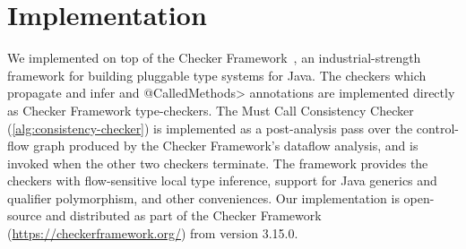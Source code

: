 \section{Implementation}
\label{sec:implementation}

We implemented \tool on top of the Checker Framework~\cite{PapiACPE2008},
an industrial-strength framework for building pluggable type systems
for Java. The checkers which propagate and infer \MustCall and
\<@CalledMethods> annotations are implemented
directly as Checker Framework type-checkers.  The Must Call Consistency
Checker (\cref{alg:consistency-checker}) is
implemented as a post-analysis pass over the control-flow graph
produced by the Checker Framework's dataflow analysis, and is invoked
when the other two checkers terminate. The framework provides the
checkers with flow-sensitive local type
inference, support for Java generics and qualifier polymorphism, and
other conveniences. Our implementation is open-source and
distributed as part of the Checker Framework (\url{https://checkerframework.org/})
from version 3.15.0.

